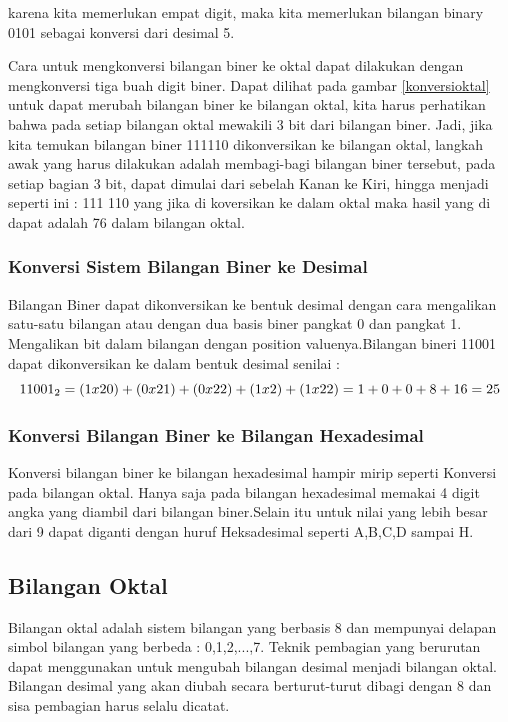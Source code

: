 karena kita memerlukan empat digit, maka kita memerlukan bilangan binary 0101 sebagai konversi dari desimal 5.

Cara untuk mengkonversi bilangan biner ke oktal dapat dilakukan dengan mengkonversi tiga buah digit biner. Dapat dilihat pada gambar \ref{konversioktal} untuk dapat merubah bilangan biner ke bilangan oktal, kita harus perhatikan bahwa pada setiap bilangan oktal mewakili 3 bit dari bilangan biner. Jadi, jika kita temukan bilangan biner 111110 dikonversikan ke bilangan oktal, langkah awak yang harus dilakukan adalah membagi-bagi bilangan biner tersebut, pada setiap bagian 3 bit, dapat dimulai dari sebelah Kanan ke Kiri, hingga menjadi seperti ini : 111 110 yang jika di koversikan ke dalam oktal maka hasil yang di dapat adalah 76 dalam bilangan oktal.

\subsubsection{Konversi Sistem Bilangan Biner ke Desimal}
Bilangan Biner dapat dikonversikan ke bentuk desimal dengan cara mengalikan satu-satu bilangan atau dengan dua basis biner pangkat 0 dan pangkat 1. Mengalikan bit dalam bilangan dengan position valuenya.Bilangan bineri 11001 dapat dikonversikan ke dalam bentuk desimal senilai : \\

\begin{equation}
11001_{2} = (1x20)+(0x21)+(0x22)+(1x2)+(1x22) \\
= 1+0+0+8+16 
= 25
\end{equation}

\subsubsection{Konversi Bilangan Biner ke Bilangan Hexadesimal}
Konversi bilangan biner ke bilangan hexadesimal hampir mirip seperti Konversi pada bilangan oktal. Hanya saja pada bilangan hexadesimal memakai 4 digit angka yang diambil dari bilangan biner.Selain itu untuk nilai yang lebih besar dari 9 dapat diganti dengan huruf Heksadesimal seperti A,B,C,D sampai H. 
\subsection{Bilangan Oktal}
Bilangan oktal adalah sistem bilangan yang berbasis 8 dan mempunyai delapan simbol bilangan yang berbeda : 0,1,2,...,7.
Teknik pembagian yang berurutan dapat menggunakan untuk mengubah bilangan desimal menjadi bilangan oktal. Bilangan desimal yang akan diubah secara berturut-turut dibagi dengan 8 dan sisa pembagian harus selalu dicatat. 
